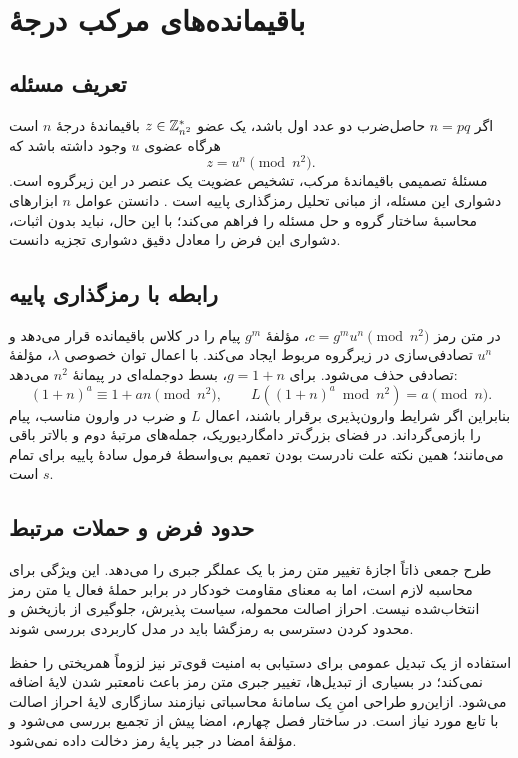 \chapter{باقیمانده‌های مرکب درجۀ }
\label{app:dcr}
\section{تعریف مسئله}
اگر $n=pq$ حاصل‌ضرب دو عدد اول باشد، یک عضو $z\in\mathbb{Z}_{n^2}^{*}$ باقیماندۀ درجۀ $n$ است هرگاه عضوی $u$ وجود داشته باشد که
\begin{equation}
z=u^n\pmod{n^2}.
\end{equation}
مسئلۀ تصمیمی باقیماندۀ مرکب، تشخیص عضویت یک عنصر در این زیرگروه است. دشواری این مسئله، از مبانی تحلیل رمزگذاری پاییه است \cite{ref179}. دانستن عوامل $n$ ابزارهای محاسبۀ ساختار گروه و حل مسئله را فراهم می‌کند؛ با این حال، نباید بدون اثبات، دشواری این فرض را معادل دقیق دشواری تجزیه دانست.

\section{رابطه با رمزگذاری پاییه}
در متن رمز $c=g^m u^n\pmod{n^2}$، مؤلفۀ $g^m$ پیام را در کلاس باقیمانده قرار می‌دهد و $u^n$ تصادفی‌سازی در زیرگروه مربوط ایجاد می‌کند. با اعمال توان خصوصی $\lambda$، مؤلفۀ تصادفی حذف می‌شود. برای $g=1+n$، بسط دوجمله‌ای در پیمانۀ $n^2$ می‌دهد:
\begin{equation}
(1+n)^a\equiv1+an\pmod{n^2},\qquad
L((1+n)^a\bmod n^2)=a\pmod n.
\end{equation}
بنابراین اگر شرایط وارون‌پذیری برقرار باشند، اعمال $L$ و ضرب در وارون مناسب، پیام را بازمی‌گرداند. در فضای بزرگ‌تر دامگارد\lr{--}یوریک، جمله‌های مرتبۀ دوم و بالاتر باقی می‌مانند؛ همین نکته علت نادرست بودن تعمیم بی‌واسطۀ فرمول سادۀ پاییه برای تمام $s$ است.

\section{حدود فرض و حملات مرتبط}
طرح جمعی ذاتاً اجازۀ تغییر متن رمز با یک عملگر جبری را می‌دهد. این ویژگی برای محاسبه لازم است، اما به معنای مقاومت خودکار در برابر حملۀ فعال یا متن رمز انتخاب‌شده نیست. احراز اصالت محموله، سیاست پذیرش، جلوگیری از بازپخش و محدود کردن دسترسی به رمزگشا باید در مدل کاربردی بررسی شوند.

استفاده از یک تبدیل عمومی برای دستیابی به امنیت قوی‌تر نیز لزوماً همریختی را حفظ نمی‌کند؛ در بسیاری از تبدیل‌ها، تغییر جبری متن رمز باعث نامعتبر شدن لایۀ اضافه می‌شود. ازاین‌رو طراحی امنِ یک سامانۀ محاسباتی نیازمند سازگاری لایۀ احراز اصالت با تابع مورد نیاز است. در ساختار فصل چهارم، امضا پیش از تجمیع بررسی می‌شود و مؤلفۀ امضا در جبر پایۀ رمز دخالت داده نمی‌شود.

